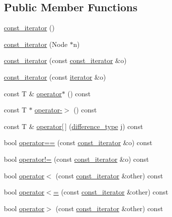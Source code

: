 \subsection*{Public Member Functions}
\begin{DoxyCompactItemize}
\item 
\hyperlink{class_q_list_1_1const__iterator_afe91d91a7946da54e2e07ffed0e8f5f5}{const\+\_\+iterator} ()
\item 
\hyperlink{class_q_list_1_1const__iterator_ac38ce73f4abe9cdbf7d7c2a0a6f5af12}{const\+\_\+iterator} (Node $\ast$n)
\item 
\hyperlink{class_q_list_1_1const__iterator_a1fac43c70d34ac46e680ec03072c3107}{const\+\_\+iterator} (const \hyperlink{class_q_list_1_1const__iterator}{const\+\_\+iterator} \&o)
\item 
\hyperlink{class_q_list_1_1const__iterator_a7564cc84899e520dcc3be05c7ab6a7be}{const\+\_\+iterator} (const \hyperlink{class_q_list_1_1iterator}{iterator} \&o)
\item 
const T \& \hyperlink{class_q_list_1_1const__iterator_ae8ba811eff602158dc96bb4091069839}{operator$\ast$} () const 
\item 
const T $\ast$ \hyperlink{class_q_list_1_1const__iterator_ae4d16b861e178013e71ee231a4a5f6e6}{operator-\/$>$} () const 
\item 
const T \& \hyperlink{class_q_list_1_1const__iterator_a0bc2c77f62a523b99897b7d9d46ec9ce}{operator\mbox{[}$\,$\mbox{]}} (\hyperlink{class_q_list_1_1const__iterator_a3fd13f34a4cad0b55bff738b349a87c6}{difference\+\_\+type} j) const 
\item 
bool \hyperlink{class_q_list_1_1const__iterator_afcc84c3f71a5a747a2323b11eee25a33}{operator==} (const \hyperlink{class_q_list_1_1const__iterator}{const\+\_\+iterator} \&o) const 
\item 
bool \hyperlink{class_q_list_1_1const__iterator_a3fed9135a0637f7057d41d7a29be7528}{operator!=} (const \hyperlink{class_q_list_1_1const__iterator}{const\+\_\+iterator} \&o) const 
\item 
bool \hyperlink{class_q_list_1_1const__iterator_a9da50890a3ecb341646c7f0b884dd75f}{operator$<$} (const \hyperlink{class_q_list_1_1const__iterator}{const\+\_\+iterator} \&other) const 
\item 
bool \hyperlink{class_q_list_1_1const__iterator_ae7f68657a78b318d3a9b11566f2755aa}{operator$<$=} (const \hyperlink{class_q_list_1_1const__iterator}{const\+\_\+iterator} \&other) const 
\item 
bool \hyperlink{class_q_list_1_1const__iterator_aba039471e2636c49e3ccf31966ee2cf6}{operator$>$} (const \hyperlink{class_q_list_1_1const__iterator}{const\+\_\+iterator} \&other) const 

\end{DoxyCompactItemize}
